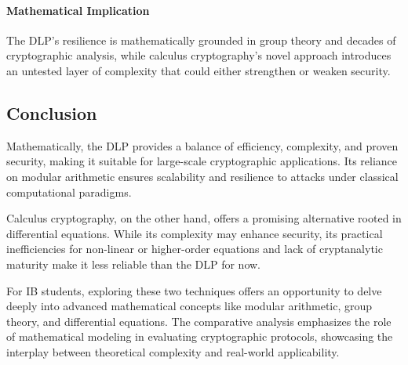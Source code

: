 \documentclass[12pt]{article}
\begin{document}
\paragraph*{Mathematical Implication}
The DLP’s resilience is mathematically grounded in group theory and decades of cryptographic analysis, while calculus cryptography’s novel approach introduces an untested layer of complexity that could either strengthen or weaken security.

\subsection*{Conclusion}

Mathematically, the DLP provides a balance of efficiency, complexity, and proven security, making it suitable for large-scale cryptographic applications. Its reliance on modular arithmetic ensures scalability and resilience to attacks under classical computational paradigms.

Calculus cryptography, on the other hand, offers a promising alternative rooted in differential equations. While its complexity may enhance security, its practical inefficiencies for non-linear or higher-order equations and lack of cryptanalytic maturity make it less reliable than the DLP for now.

For IB students, exploring these two techniques offers an opportunity to delve deeply into advanced mathematical concepts like modular arithmetic, group theory, and differential equations. The comparative analysis emphasizes the role of mathematical modeling in evaluating cryptographic protocols, showcasing the interplay between theoretical complexity and real-world applicability.



\newpage
\end{document}
